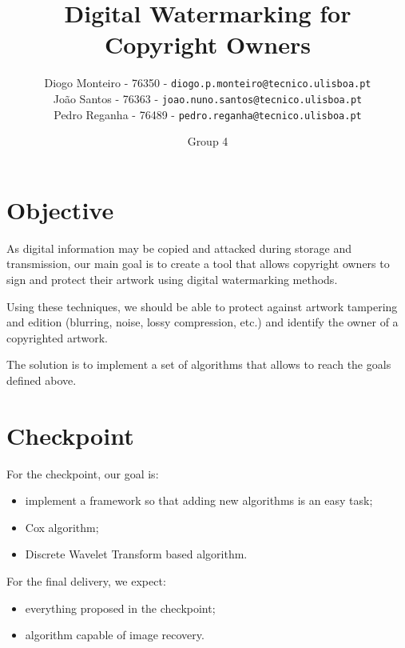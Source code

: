 \documentclass[10pt]{article}
\begin{document}
\title{Digital Watermarking for Copyright Owners}
\author{
    Diogo Monteiro - 76350 - \texttt{diogo.p.monteiro@tecnico.ulisboa.pt} \\
    João Santos - 76363 - \texttt{joao.nuno.santos@tecnico.ulisboa.pt} \\
    Pedro Reganha - 76489 - \texttt{pedro.reganha@tecnico.ulisboa.pt} \\
}
\date{Group 4}

\maketitle

\section{Objective}
    As digital information may be copied and attacked during storage and transmission, our main goal is to create a tool that allows copyright owners to sign and protect their artwork using digital watermarking methods.
    
   Using these techniques, we should be able to protect against artwork tampering and edition (blurring, noise, lossy compression, etc.) and identify the owner of a copyrighted artwork.
    
    The solution is to implement a set of algorithms that allows to reach the goals defined above.

\section{Checkpoint}
For the checkpoint, our goal is:

    \begin{itemize}
        \item implement a framework so that adding new algorithms is an easy task;
        \item Cox algorithm;
        \item Discrete Wavelet Transform based algorithm.
    \end{itemize}
    
For the final delivery, we expect:
    \begin{itemize}
        \item everything proposed in the checkpoint;
        \item algorithm capable of image recovery.
    \end{itemize}
    
    
\end{document}

